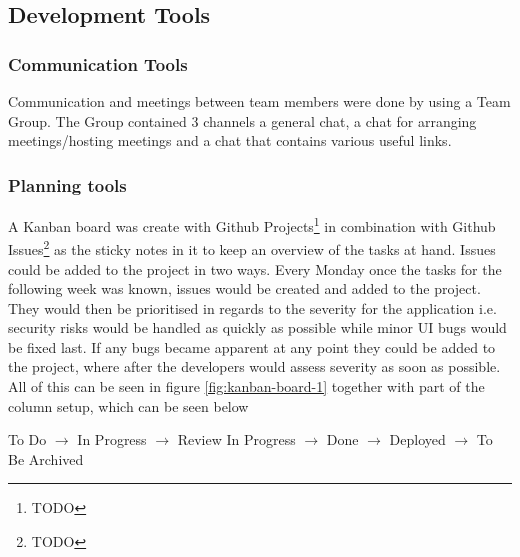 \documentclass[report/main.tex]{subfiles}
\begin{document}
        \subsection{Development Tools}
        \label{subsec:development-tools}
            \subsubsection{Communication Tools}
            \label{subsubsec:communication-tools}
                Communication and meetings between team members were done by using a Team Group. The Group contained 3 channels a general chat, a chat for arranging meetings/hosting meetings and a chat that contains various useful links. %
                
            \subsubsection{Planning tools}
            \label{subsubsec:planning-tools}
                A Kanban board was create with Github Projects\footnote{TODO} in combination with Github Issues\footnote{TODO} as the sticky notes in it to keep an overview of the tasks at hand. Issues could be added to the project in two ways. Every Monday once the tasks for the following week was known, issues would be created and added to the project. They would then be prioritised in regards to the severity for the application i.e. security risks would be handled as quickly as possible while minor UI bugs would be fixed last. If any bugs became apparent at any point they could be added to the project, where after the developers would assess severity as soon as possible. All of this can be seen in figure \ref{fig:kanban-board-1}  together with part of the column setup, which can be seen below
                
                \begin{center}
                    To Do $\longrightarrow$ In Progress $\longrightarrow$ Review In Progress $\longrightarrow$ Done $\longrightarrow$ Deployed $\longrightarrow$ To Be Archived
                \end{center}
                
\end{document}
